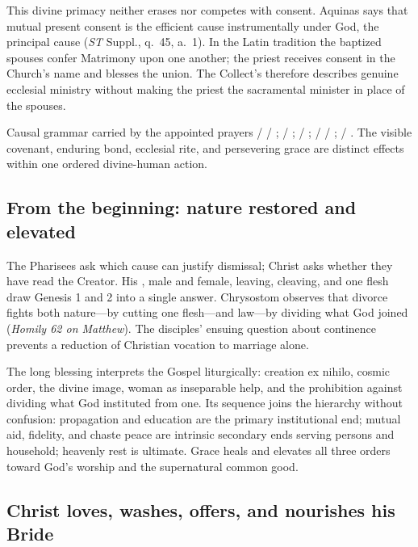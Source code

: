 This divine primacy neither erases nor competes with consent. Aquinas says that mutual present consent is the efficient cause instrumentally under God, the principal cause (\emph{ST} Suppl., q.~45, a.~1). In the Latin tradition the baptized spouses confer Matrimony upon one another; the priest receives consent in the Church's name and blesses the union. The Collect's  therefore describes genuine ecclesial ministry without making the priest the sacramental minister in place of the spouses.

\begin{sourcecard}{Causal grammar carried by the appointed prayers}
 /  / ;  / ;  / ;  /  / ;  / . The visible covenant, enduring bond, ecclesial rite, and persevering grace are distinct effects within one ordered divine-human action.
\end{sourcecard}

\subsection*{From the beginning: nature restored and elevated\enspace{}}

The Pharisees ask which cause can justify dismissal; Christ asks whether they have read the Creator. His , male and female, leaving, cleaving, and one flesh draw Genesis 1 and 2 into a single answer. Chrysostom observes that divorce fights both nature---by cutting one flesh---and law---by dividing what God joined (\emph{Homily 62 on Matthew}). The disciples' ensuing question about continence prevents a reduction of Christian vocation to marriage alone.

The long blessing interprets the Gospel liturgically: creation ex nihilo, cosmic order, the divine image, woman as inseparable help, and the prohibition against dividing what God instituted from one. Its sequence joins the hierarchy without confusion: propagation and education are the primary institutional end; mutual aid, fidelity, and chaste peace are intrinsic secondary ends serving persons and household; heavenly rest is ultimate. Grace heals and elevates all three orders toward God's worship and the supernatural common good.

\subsection*{Christ loves, washes, offers, and nourishes his Bride\enspace{}}

